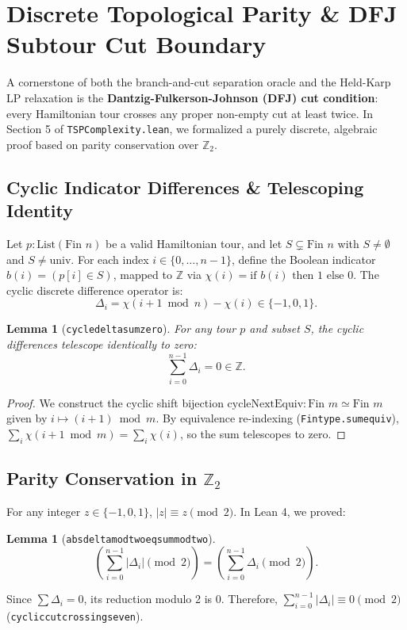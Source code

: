 \documentclass[11pt,a4paper]{article}
\renewcommand{\_}{\origunderscore\allowbreak}
\theoremstyle{plain}
\newtheorem{lemma}[theorem]{Lemma}
\theoremstyle{definition}
\theoremstyle{remark}
\begin{document}
\section{Discrete Topological Parity \& DFJ Subtour Cut Boundary}

A cornerstone of both the branch-and-cut separation oracle and the Held-Karp LP relaxation is the \textbf{Dantzig-Fulkerson-Johnson (DFJ) cut condition}: every Hamiltonian tour crosses any proper non-empty cut at least twice. In Section 5 of \texttt{TSP\allowbreak Complexity.\allowbreak lean}, we formalized a purely discrete, algebraic proof based on parity conservation over $\mathbb{Z}_2$.

\subsection{Cyclic Indicator Differences \& Telescoping Identity}
Let $p : \text{List}(\text{Fin } n)$ be a valid Hamiltonian tour, and let $S \subsetneq \text{Fin } n$ with $S \ne \emptyset$ and $S \ne \text{univ}$.
For each index $i \in \{0, \dots, n-1\}$, define the Boolean indicator $b(i) = (p[i] \in S)$, mapped to $\mathbb{Z}$ via $\chi(i) = \text{if } b(i) \text{ then } 1 \text{ else } 0$.
The cyclic discrete difference operator is:
\begin{equation}
  \Delta_i = \chi(i+1 \bmod n) - \chi(i) \in \{-1, 0, 1\}.
\end{equation}

\begin{lemma}[\texttt{cycle\_delta\_sum\_zero}]
For any tour $p$ and subset $S$, the cyclic differences telescope identically to zero:
\begin{equation}
  \sum_{i=0}^{n-1} \Delta_i = 0 \in \mathbb{Z}.
\end{equation}
\end{lemma}
\begin{proof}
We construct the cyclic shift bijection $\text{cycleNextEquiv} : \text{Fin } m \simeq \text{Fin } m$ given by $i \mapsto (i + 1) \bmod m$. By equivalence re-indexing (\texttt{Fintype.sum\_equiv}), $\sum_{i} \chi(i+1 \bmod m) = \sum_{i} \chi(i)$, so the sum telescopes to zero.
\end{proof}

\subsection{Parity Conservation in \texorpdfstring{$\mathbb{Z}_2$}{Z2}}
For any integer $z \in \{-1, 0, 1\}$, $|z| \equiv z \pmod 2$. In Lean 4, we proved:
\begin{lemma}[\texttt{abs\_delta\_mod\_two\_eq\_sum\_mod\_two}]
\begin{equation}
  \left(\sum_{i=0}^{n-1} |\Delta_i| \pmod 2\right) = \left(\sum_{i=0}^{n-1} \Delta_i \pmod 2\right).
\end{equation}
\end{lemma}
Since $\sum \Delta_i = 0$, its reduction modulo 2 is $0$. Therefore, $\sum_{i=0}^{n-1} |\Delta_i| \equiv 0 \pmod 2$ (\texttt{cyclic\_cut\_crossings\_even}).
\end{document}
